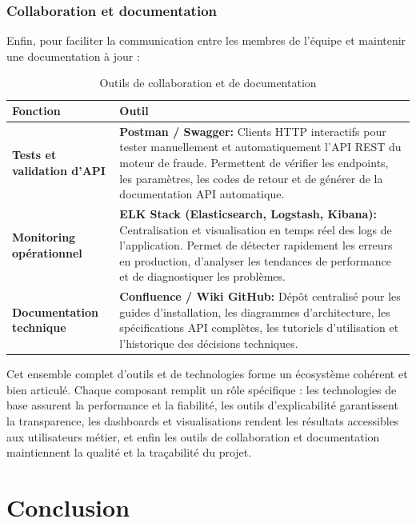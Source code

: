 \documentclass[a4paper, oneside, 12pt]{book}
\newcommand{\thead}[1]{\cellcolor{EYdark}\textcolor{white}{\textbf{#1}}}
\renewcommand{\thead}[1]{\cellcolor{EYyellow}\textcolor{EYdark}{\textbf{#1}}}
\begin{document}
\subsubsection{Collaboration et documentation}

\hspace{0.5cm}Enfin, pour faciliter la communication entre les membres de l'équipe et maintenir une documentation à jour :

\begin{table}[H]
\centering
\begin{tabular}{|p{3.5cm}|p{11.8cm}|}
\hline
\thead{Fonction} & \thead{Outil} \\
\hline
\textbf{Tests et validation d'API} & \textbf{Postman / Swagger:} Clients HTTP interactifs pour tester manuellement et automatiquement l'API REST du moteur de fraude. Permettent de vérifier les endpoints, les paramètres, les codes de retour et de générer de la documentation API automatique. \\
\hline
\textbf{Monitoring opérationnel} & \textbf{ELK Stack (Elasticsearch, Logstash, Kibana):} Centralisation et visualisation en temps réel des logs de l'application. Permet de détecter rapidement les erreurs en production, d'analyser les tendances de performance et de diagnostiquer les problèmes. \\
\hline
\textbf{Documentation technique} & \textbf{Confluence / Wiki GitHub:} Dépôt centralisé pour les guides d'installation, les diagrammes d'architecture, les spécifications API complètes, les tutoriels d'utilisation et l'historique des décisions techniques. \\
\hline
\end{tabular}
\caption{Outils de collaboration et de documentation}
\end{table}

\hspace{0.5cm}Cet ensemble complet d'outils et de technologies forme un écosystème cohérent et bien articulé. Chaque composant remplit un rôle spécifique : les technologies de base assurent la performance et la fiabilité, les outils d'explicabilité garantissent la transparence, les dashboards et visualisations rendent les résultats accessibles aux utilisateurs métier, et enfin les outils de collaboration et documentation maintiennent la qualité et la traçabilité du projet. 


\section{Conclusion}
\end{document}

